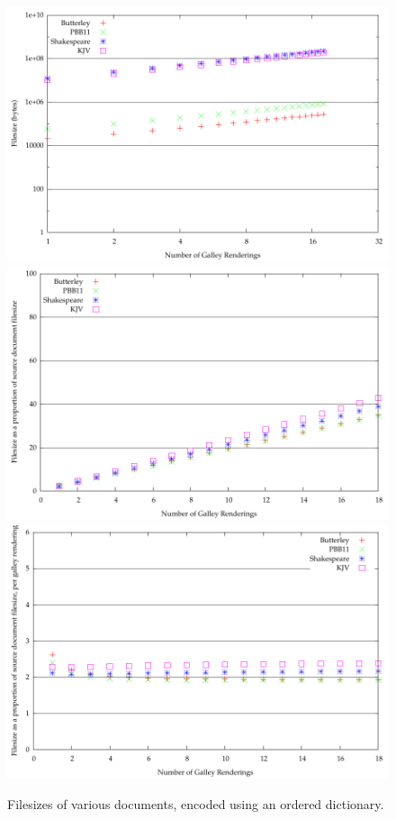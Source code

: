 \begin{figure}
  \begin{center}
  \includegraphics[width=\textwidth]{gnuplot/4-b}
  \includegraphics[width=\textwidth]{gnuplot/4-s}
  \includegraphics[width=\textwidth]{gnuplot/4-r}
  \end{center}
  \caption[Filesizes of documents with an ordered dictionary]{Filesizes of various documents, encoded using an ordered dictionary.}
  \label{fig:size-ord}
\end{figure}



